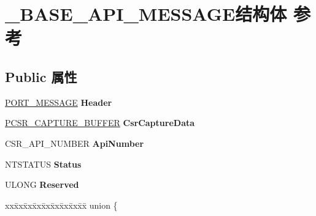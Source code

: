 \hypertarget{struct___b_a_s_e___a_p_i___m_e_s_s_a_g_e}{}\section{\+\_\+\+B\+A\+S\+E\+\_\+\+A\+P\+I\+\_\+\+M\+E\+S\+S\+A\+G\+E结构体 参考}
\label{struct___b_a_s_e___a_p_i___m_e_s_s_a_g_e}
\subsection*{Public 属性}
\begin{DoxyCompactItemize}
\item 
\mbox{\label{struct___b_a_s_e___a_p_i___m_e_s_s_a_g_e_a1905d1dd87d58e75e184121d93a9bd7c}} 
\hyperlink{struct___p_o_r_t___m_e_s_s_a_g_e___h_e_a_d_e_r}{P\+O\+R\+T\+\_\+\+M\+E\+S\+S\+A\+GE} {\bfseries Header}
\item 
\mbox{\label{struct___b_a_s_e___a_p_i___m_e_s_s_a_g_e_a56e7a5fb1489f8517ae0dc888977dce3}} 
\hyperlink{struct___c_s_r___c_a_p_t_u_r_e___b_u_f_f_e_r}{P\+C\+S\+R\+\_\+\+C\+A\+P\+T\+U\+R\+E\+\_\+\+B\+U\+F\+F\+ER} {\bfseries Csr\+Capture\+Data}
\item 
\mbox{\label{struct___b_a_s_e___a_p_i___m_e_s_s_a_g_e_ae0afa9d9a9e99799f3f5be031d0c7213}} 
C\+S\+R\+\_\+\+A\+P\+I\+\_\+\+N\+U\+M\+B\+ER {\bfseries Api\+Number}
\item 
\mbox{\label{struct___b_a_s_e___a_p_i___m_e_s_s_a_g_e_a0495d1066922c501e9dc0e20606e0bcb}} 
N\+T\+S\+T\+A\+T\+US {\bfseries Status}
\item 
\mbox{\label{struct___b_a_s_e___a_p_i___m_e_s_s_a_g_e_a5f78e93a9a76a7c2b587fdfaaab67a2c}} 
U\+L\+O\+NG {\bfseries Reserved}
\item 
\mbox{\label{struct___b_a_s_e___a_p_i___m_e_s_s_a_g_e_ab4dd8adaf8b8e5a80ce67ac52eeb1f66}} 
\begin{tabbing}
xx\=xx\=xx\=xx\=xx\=xx\=xx\=xx\=xx\=\kill
union \{\\

\end{tabbing}
\end{DoxyCompactItemize}
